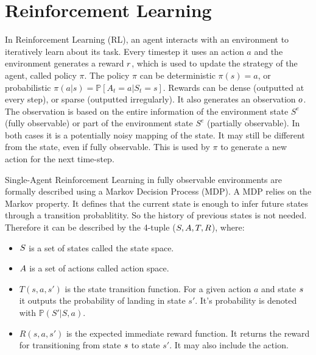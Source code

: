 \section{Reinforcement Learning}

In Reinforcement Learning (RL), an agent interacts with an environment to iteratively learn about its task. Every timestep it uses an action $a$ and the environment generates a reward $r$, which is used to update the strategy of the agent, called policy $\pi$. The policy $\pi$ can be deterministic $\pi(s) = a$, or probabilistic $\pi(a|s) = \mathbb{P}[A_t=a|S_t=s]$. Rewards can be dense (outputted at every step), or sparse (outputted irregularly). 
It also generates an observation $o$. The observation is based on the entire information of the environment state $S^e$ (fully observable) or part of the environment state $S^e$ (partially observable). In both cases it is a potentially noisy mapping of the state. It may still be different from the state, even if fully observable. This is used by $\pi$ to generate a new action for the next time-step. \par

Single-Agent Reinforcement Learning in fully observable environments are formally described using a Markov Decision Process (MDP). A MDP relies on the Markov property. It defines that the current state is enough to infer future states through a transition probablitity. So the history of previous states is not needed. Therefore it can be described by the 4-tuple ($S, A, T, R$), where:
\begin{itemize}[noitemsep,nolistsep]
	\item $S$ is a set of states called the state space.
	\item $A$ is a set of actions called action space.
	\item $T(s, a, s')$ is the state transition function. For a given action $a$ and state $s$ it outputs the probability of landing in state $s'$. It's probability is denoted with $\mathbb{P}(S'|S,a)$.
	\item $R(s,a,s')$ is the expected immediate reward function. It returns the reward for transitioning from state $s$ to state $s'$. It may also include the action.
\end{itemize}

